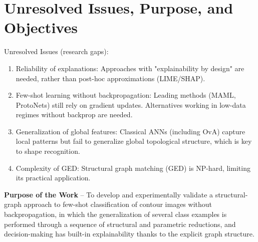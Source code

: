 \documentclass[conference]{IEEEtran}
\begin{document}
\section{Unresolved Issues, Purpose, and Objectives}
Unresolved Issues (research gaps):
\begin{enumerate}
    \item Reliability of explanations: Approaches with "explainability by design" are needed, rather than post-hoc approximations (LIME/SHAP).
    \item Few-shot learning without backpropagation: Leading methods (MAML, ProtoNets) still rely on gradient updates. Alternatives working in low-data regimes without backprop are needed.
    \item Generalization of global features: Classical ANNs (including OvA) capture local patterns but fail to generalize global topological structure, which is key to shape recognition.
    \item Complexity of GED: Structural graph matching (GED) is NP-hard, limiting its practical application.
\end{enumerate}

\textbf{Purpose of the Work} -- To develop and experimentally validate a structural-graph approach to few-shot classification of contour images without backpropagation, in which the generalization of several class examples is performed through a sequence of structural and parametric reductions, and decision-making has built-in explainability thanks to the explicit graph structure.
\end{document}
